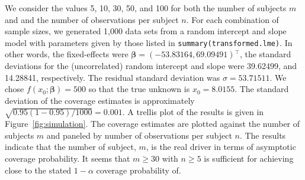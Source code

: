 \documentclass{article}\usepackage[]{graphicx}\usepackage[]{color}
\newcommand{\trans}{\ensuremath{^\top}}
\begin{document}
We consider the values 5, 10, 30, 50, and 100 for both the number of subjects $m$ and and the number of observations per subject $n$.  For each combination of sample sizes, we generated 1,000 data sets from a random intercept and slope model with parameters given by those listed in \texttt{summary(transformed.lme)}.  In other words, the fixed-effects were $\bm{\beta} = \left(-53.83164, 69.09491\right)\trans$, the standard deviations for the (uncorrelated) random intercept and slope were 39.62499, and 14.28841, respectively.  The residual standard deviation was $\sigma = 53.71511$.  We chose $f\left(x_0; \bm{\beta}\right) = 500$ so that the true unknown is $x_0 = 8.0155$.  The standard deviation of the coverage estimates is approximately $\sqrt{0.95\left(1-0.95\right)/1000} = 0.001$.  A trellis plot of the results is given in Figure~\ref{fig:simulation}.  The coverage estimates are plotted against the number of subjects $m$ and paneled by number of observations per subject $n$. The results indicate that the number of subject, $m$, is the real driver in terms of asymptotic coverage probability. It seems that $m \ge 30$ with $n \ge 5$ is sufficient for achieving close to the stated $1 - \alpha$ coverage probability of. 
\end{document}
